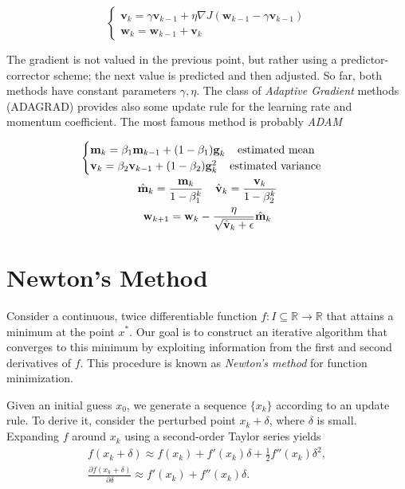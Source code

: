 \documentclass{article}
\numberwithin{equation}{subsection}
\begin{document}
\begin{equation}
    \begin{cases}
        \textbf{v}_k = \gamma \textbf{v}_{k-1} + \eta \nabla J(\textbf{w}_{k-1}-\gamma \textbf{v}_{k-1}) \\
        \textbf{w}_k = \textbf{w}_{k-1} + \textbf{v}_k
    \end{cases}
\end{equation}

The gradient is not valued in the previous point, but rather using a predictor-corrector scheme; the next value is predicted and then adjusted. So far, both methods have constant parameters $\gamma,\eta$. The class of \textit{Adaptive Gradient} methods (ADAGRAD) provides also some update rule for the learning rate and momentum coefficient. The most famous method is probably \textit{ADAM}

\begin{gather}
        \begin{cases}
        \textbf{m}_k = \beta_1\textbf{m}_{k-1} + (1-\beta_1) \textbf{g}_k  \;\;\;\; \text{estimated mean}\\
        \textbf{v}_k = \beta_2\textbf{v}_{k-1} + (1-\beta_2) \textbf{g}_k^2 \;\;\;\;\text{estimated variance}
    \end{cases}\\
    \hat{\textbf{m}}_k = \frac{\textbf{m}_k}{1-\beta_1^k} \;\;\;\; \hat{\textbf{v}}_k = \frac{\textbf{v}_k}{1-\beta_2^k} \notag \\
    \textbf{w}_{k+1} = \textbf{w}_k - \frac{\eta}{\sqrt{\hat{\textbf{v}}_k+\epsilon}} \hat{\textbf{m}}_k
\end{gather}

\section{Newton’s Method}
Consider a continuous, twice differentiable function $f : I \subseteq \mathbb{R} \to \mathbb{R}$ that attains a minimum at the point $x^*$. Our goal is to construct an iterative algorithm that converges to this minimum by exploiting information from the first and second derivatives of $f$. This procedure is known as \emph{Newton’s method} for function minimization.  

Given an initial guess $x_0$, we generate a sequence $\{x_k\}$ according to an update rule. To derive it, consider the perturbed point $x_k + \delta$, where $\delta$ is small. Expanding $f$ around $x_k$ using a second-order Taylor series yields
\begin{gather*}
    f(x_k + \delta) \approx f(x_k) + f'(x_k)\delta + \tfrac{1}{2} f''(x_k)\delta^2, \\
    \frac{\partial f(x_k+\delta)}{\partial \delta} \approx f'(x_k) + f''(x_k)\delta.
\end{gather*}
\end{document}
